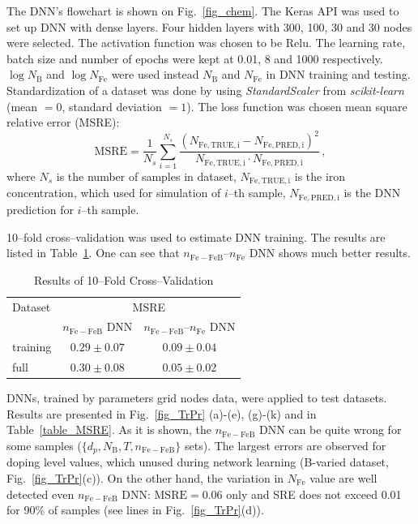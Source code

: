 \documentclass[journal]{IEEEtran}
\begin{document}
The DNN's flowchart is shown on Fig.~\ref{fig_chem}.
The Keras API \cite{Keras} was used to set up DNN with dense layers.
Four hidden  layers with 300, 100, 30 and 30 nodes were selected.
The activation function was chosen to be Relu.
The learning rate, batch size and number of epochs were kept at 0.01, 8 and 1000 respectively.
$\log N_\mathrm{B}$ and $\log N_\mathrm{Fe}$ were used instead
$N_\mathrm{B}$ and $N_\mathrm{Fe}$ in DNN training and testing.
Standardization of a dataset was done by using \emph{StandardScaler} from \emph{scikit-learn}
(mean $=0$, standard deviation  $=1$).
The loss function was chosen mean square relative error (MSRE):
\begin{equation}
\label{eqMSRE}
    \mathrm{MSRE}=\frac{1}{N_s}\sum_{i=1}^{N_s}\frac{(N_\mathrm{Fe,TRUE,i}-N_\mathrm{Fe,PRED,i})^2}{N_\mathrm{Fe,TRUE,i}\cdot N_\mathrm{Fe,PRED,i}}\,,
\end{equation}
where
$N_s$ is the number of samples in dataset,
$N_\mathrm{Fe,TRUE,i}$ is the iron concentration, which used for simulation of $i$--th sample,
$N_\mathrm{Fe,PRED,i}$ is the DNN prediction for $i$--th sample.


10--fold cross--validation was used to estimate DNN training.
The results are listed in Table~\ref{table_CV}.
One can see that $n_\mathrm{Fe-FeB}$--$n_\mathrm{Fe}$ DNN
shows much better results.



\begin{table}[!t]
\renewcommand{\arraystretch}{1.3}
\caption{Results of 10--Fold Cross--Validation}
\label{table_CV}
\centering
\begin{tabular}{lcc}
\hline
Dataset & \multicolumn{2}{c}{MSRE}\\
 & $n_\mathrm{Fe-FeB}$ DNN &$n_\mathrm{Fe-FeB}$--$n_\mathrm{Fe}$ DNN\\
\hline
training&$0.29\pm0.07$&$0.09\pm0.04$ \\
full&$0.30\pm0.08$& $0.05\pm0.02$\\
\hline
\end{tabular}
\end{table}

DNNs, trained by parameters grid nodes data, were applied to test datasets.
Results are presented in Fig.~\ref{fig_TrPr} (a)-(e), (g)-(k) and in Table~\ref{table_MSRE}.
As it is shown, the $n_\mathrm{Fe-FeB}$ DNN can be quite wrong for some samples
($\{d_p,N_\mathrm{B},T,n_\mathrm{Fe-FeB}\}$ sets).
The largest errors are observed for doping level values, which unused during  network learning
(B-varied dataset, Fig.~\ref{fig_TrPr}(c)).
On the other hand, the variation in $N_\mathrm{Fe}$ value are well detected even $n_\mathrm{Fe-FeB}$ DNN:
$\mathrm{MSRE}=0.06$ only and SRE does not exceed 0.01 for 90\% of samples (see lines in Fig.~\ref{fig_TrPr}(d)).
\end{document}
